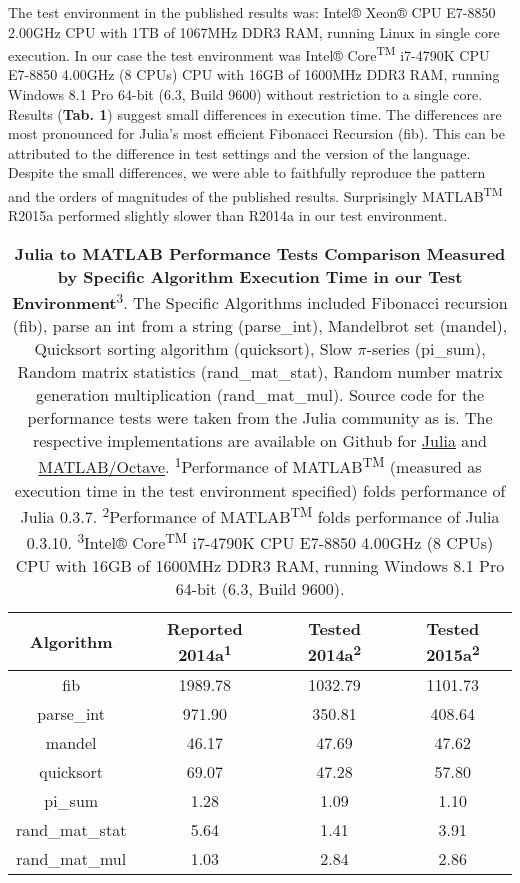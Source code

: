 The test environment in the published results was: Intel® Xeon® CPU E7-8850 2.00GHz CPU with 1TB of 1067MHz DDR3 RAM, running Linux in single core execution. In our case the test environment was Intel® Core\textsuperscript{TM} i7-4790K CPU E7-8850 4.00GHz (8 CPUs) CPU with 16GB of 1600MHz DDR3 RAM, running Windows 8.1 Pro 64-bit (6.3, Build 9600) without restriction to a single core. Results (\textbf{Tab. 1}) suggest small differences in execution time. The differences are most pronounced for Julia's most efficient Fibonacci Recursion (fib). This can be attributed to the difference in test settings and the version of the language. Despite the small differences, we were able to faithfully reproduce the pattern and the orders of magnitudes of the published results. Surprisingly MATLAB\textsuperscript{TM} R2015a performed slightly slower than R2014a in our test environment.

\begin{table} 
    \begin{tabular}{cccc}
    \hline
        \textbf{Algorithm} & \textbf{Reported 2014a\textsuperscript{1}} & \textbf{Tested  2014a\textsuperscript{2}} & \textbf{Tested 2015a\textsuperscript{2}}\\
        \hline
        fib & 1989.78 & 1032.79 & 1101.73 \\ 
        \hline
        parse\_int & 971.90 & 350.81 & 408.64 \\ 
        \hline
        mandel & 46.17 & 47.69 & 47.62 \\ 
        \hline
        quicksort & 69.07 & 47.28 & 57.80 \\ 
        \hline
        pi\_sum & 1.28 & 1.09 & 1.10 \\ 
        \hline
        rand\_mat\_stat & 5.64 & 1.41 & 3.91 \\ 
        \hline
        rand\_mat\_mul & 1.03 & 2.84 & 2.86 \\
        \hline
    \end{tabular}
    \caption{\textbf{Julia to MATLAB Performance Tests Comparison Measured by Specific Algorithm Execution Time in our Test Environment}\textsuperscript{3}. The Specific Algorithms included Fibonacci recursion (fib), parse an int from a string (parse\_int), Mandelbrot set (mandel), Quicksort sorting algorithm (quicksort), Slow $\pi$-series (pi\_sum), Random matrix statistics (rand\_mat\_stat), Random number matrix generation multiplication (rand\_mat\_mul). Source code for the performance tests were taken from the Julia community as is. The respective implementations are available on Github for \href{https://github.com/JuliaLang/julia/blob/master/test/perf/micro/perf.jl}{Julia} and \href{https://github.com/JuliaLang/julia/blob/master/test/perf/micro/perf.m}{MATLAB/Octave}. \textsuperscript{1}Performance of MATLAB\textsuperscript{TM} (measured as execution time in the test environment specified) folds performance of Julia 0.3.7. \textsuperscript{2}Performance of MATLAB\textsuperscript{TM} folds performance of Julia 0.3.10. \textsuperscript{3}Intel® Core\textsuperscript{TM} i7-4790K CPU E7-8850 4.00GHz (8 CPUs) CPU with 16GB of 1600MHz DDR3 RAM, running Windows 8.1 Pro 64-bit (6.3, Build 9600).}
\end{table}\\
  
